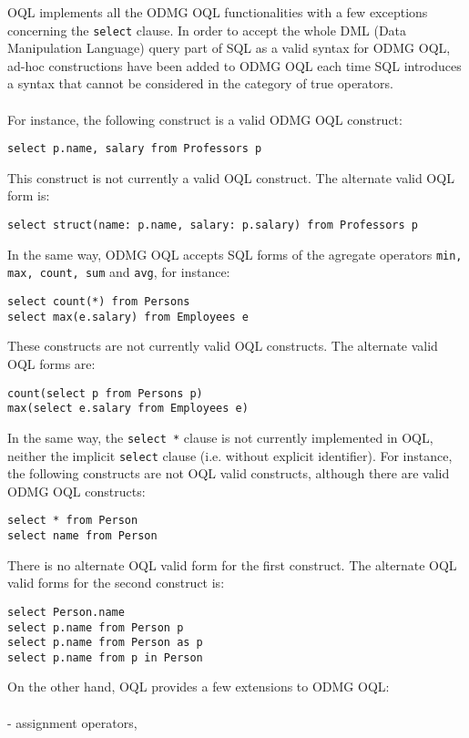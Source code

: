 \label{diffoql}
OQL implements all the ODMG OQL functionalities with a few exceptions
concerning the \texttt{select} clause.
In order to accept the whole DML (Data Manipulation Language) query part of
SQL as a valid syntax for ODMG OQL, ad-hoc constructions have been
added to ODMG OQL each time SQL introduces a syntax that cannot be
considered in the category of true operators.
\\
\\
For instance, the following construct is a valid ODMG OQL construct:
\verbsize
\begin{verbatim}
select p.name, salary from Professors p
\end{verbatim}
\normalsize
This construct is not currently a valid OQL construct. The alternate valid
OQL form is:
\verbsize
\begin{verbatim}
select struct(name: p.name, salary: p.salary) from Professors p
\end{verbatim}
\normalsize
In the same way, ODMG OQL accepts SQL forms of the agregate operators
\texttt{min, max, count, sum} and \texttt{avg}, for instance:
\verbsize
\begin{verbatim}
select count(*) from Persons
select max(e.salary) from Employees e
\end{verbatim}
\normalsize
These constructs are not currently valid OQL constructs. The alternate valid
OQL forms are:
\begin{verbatim}
count(select p from Persons p)
max(select e.salary from Employees e)
\end{verbatim}
\normalsize
In the same way, the \texttt{select *} clause is not currently implemented
in OQL, neither the implicit \texttt{select} clause (i.e. without explicit
identifier). For instance, the following constructs are not OQL valid
constructs, although there are valid ODMG OQL constructs:
\begin{verbatim}
select * from Person
select name from Person
\end{verbatim}
\normalsize
There is no alternate OQL valid form for the first construct.
The alternate OQL valid forms for the second construct is:
\begin{verbatim}
select Person.name
select p.name from Person p
select p.name from Person as p
select p.name from p in Person
\end{verbatim}
\normalsize
On the other hand, OQL provides a few extensions to ODMG OQL:
\\
\\
\ixy - assignment operators,\\
